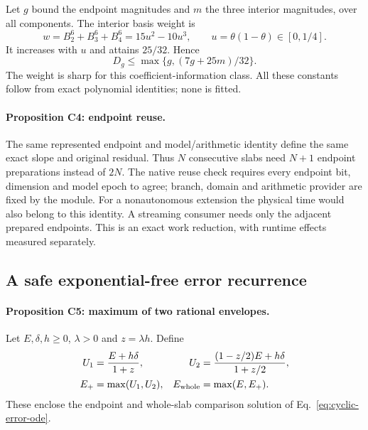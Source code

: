 Let $g$ bound the endpoint magnitudes and $m$ the three interior magnitudes,
over all components. The interior basis weight is
\begin{equation}
 w=B_2^6+B_3^6+B_4^6=15u^2-10u^3,
 \qquad u=\theta(1-\theta)\in[0,1/4].
\end{equation}
It increases with $u$ and attains $25/32$. Hence
\begin{equation}
 D_g\le\max\{g,(7g+25m)/32\}.                             \label{eq:cyclic-dg}
\end{equation}
The weight is sharp for this coefficient-information class. All these
constants follow from exact polynomial identities; none is fitted.

\paragraph{Proposition C4: endpoint reuse.}
The same represented endpoint and model/arithmetic identity define the
same exact slope and original residual. Thus $N$ consecutive slabs need
$N+1$ endpoint preparations instead of $2N$.
The native reuse check requires every endpoint bit, dimension and model
epoch to agree; branch, domain and arithmetic provider are fixed by the
module. For a nonautonomous extension the physical time would also belong
to this identity. A streaming consumer needs only the adjacent prepared
endpoints. This is an exact work reduction, with runtime effects measured
separately.

\subsection{A safe exponential-free error recurrence}

\paragraph{Proposition C5: maximum of two rational envelopes.}
Let $E,\delta,h\ge0$, $\lambda>0$ and $z=\lambda h$. Define
\begin{align}
 U_1&=\frac{E+h\delta}{1+z},&
 U_2&=\frac{(1-z/2)E+h\delta}{1+z/2},\\
 E_+&=\max(U_1,U_2),&E_{\rm whole}&=\max(E,E_+).            \label{eq:cyclic-rational-radius}
\end{align}
These enclose the endpoint and whole-slab comparison solution of
Eq.~\eqref{eq:cyclic-error-ode}.

